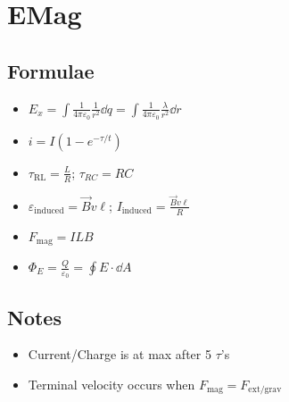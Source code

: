 \documentclass{article}
\begin{document}
  \section{EMag}
  \subsection{Formulae}
  \begin{itemize}
    \item $E_x=\int\frac{1}{4\pi\varepsilon_0}\frac{1}{r^2}\dd q = \int \frac{1}{4\pi\varepsilon_0}\frac{\lambda}{r^2}\dd r$
    \item $i=I(1-e^{-\tau/t})$
    \item $\tau_{\mathrm{RL}}=\frac{L}{R}$; $\tau_{RC}=RC$
    \item $\varepsilon_{\mathrm{induced}}=\vec{B}v\ell$; $I_{\mathrm{induced}}=\frac{\vec{B}v\ell}{R}$
    \item $F_{\mathrm{mag}}=ILB$
    \item $\Phi_E=\frac{Q}{\varepsilon_0}=\oint E\cdot\dd A$
  \end{itemize}
  \subsection{Notes}
  \begin{itemize}
    \item Current/Charge is at max after 5 $\tau$'s
    \item Terminal velocity occurs when $F_{\mathrm{mag}}=F_{\mathrm{ext/grav}}$
  \end{itemize}
\end{document}
